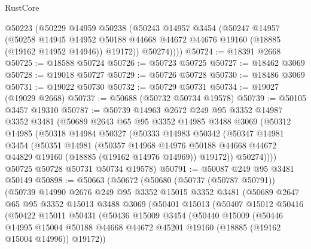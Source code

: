 \begin{lexlean}{RustCore}
\begin{coremodule}
        @50223
        (@50229
          @14959
          @50238
          (@50243
            @14957
            @3454
            (@50247
              @14957
              (@50258
                @14945
                @14952
                @50188
                @44668
                @44672
                @44676
                @19160
                (@18885 (@19162 @14952 @14946))
                @19172))
            @50274))))
@50724 := @18391 @2668
@50725 := @18588 @50724
@50726 := @50723 @50725
@50727 := @18462 @3069
@50728 := @19018 @50727
@50729 := @50726 @50728
@50730 := @18486 @3069
@50731 := @19022 @50730
@50732 := @50729 @50731
@50734 := @19027 (@19029 @2668)
@50737 := @50688 (@50732 @50734 @19578)
@50739 := @50105 @3457 @19310
@50787 := @50739
    @14963
    @2672
    @249
    @95
    @3352
    @14987
    @3352
    @3481
    (@50689
      @2643
      @65
      @95
      @3352
      @14985
      @3488
      @3069
      (@50312
        @14985
        (@50318
          @14984
          @50327
          (@50333
            @14983
            @50342
            (@50347
              @14981
              @3454
              (@50351
                @14981
                (@50357
                  @14968
                  @14976
                  @50188
                  @44668
                  @44672
                  @44829
                  @19160
                  (@18885 (@19162 @14976 @14969))
                  @19172))
              @50274))))
      @50725
      @50728
      @50731
      @50734
      @19578)
@50791 := @50087 @249 @95 @3481 @50149
@50898 := @50663
    (@50672
      (@50680
        (@50737 (@50787 @50791))
        (@50739
          @14990
          @2676
          @249
          @95
          @3352
          @15015
          @3352
          @3481
          (@50689
            @2647
            @65
            @95
            @3352
            @15013
            @3488
            @3069
            (@50401
              @15013
              (@50407
                @15012
                @50416
                (@50422
                  @15011
                  @50431
                  (@50436
                    @15009
                    @3454
                    (@50440
                      @15009
                      (@50446
                        @14995
                        @15004
                        @50188
                        @44668
                        @44672
                        @45201
                        @19160
                        (@18885 (@19162 @15004 @14996))
                        @19172))

\end{coremodule}
\end{lexlean}
